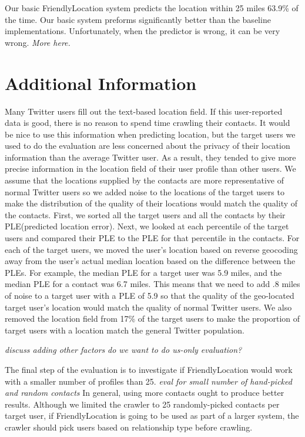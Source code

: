 Our basic FriendlyLocation system predicts the location within 25 miles 63.9\% of
the time.
%
Our basic system preforms significantly better than the baseline implementations.
%
Unfortunately, when the predictor is wrong, it can be very wrong. \emph{More here.}
%
%


\section{Additional Information}
Many Twitter users fill out the text-based location field.
%
If this user-reported data is good, there is no reason to spend time
crawling their contacts.
%
It would be nice to use this information when predicting location, but
the target users we used to do the evaluation are less concerned about
the privacy of their location information than the average Twitter user.
%
As a result, they tended to give more precise information in the location
field of their user profile than other users.
%
We assume that the locations supplied by the contacts are more
representative of normal Twitter users so we added noise to the locations
of the target users to make the distribution of the quality of their
locations would match the quality of the contacts.
%
First, we sorted all the target users and all the contacts by their
PLE(predicted location error).
%
Next, we looked at each percentile of the target users and compared
their PLE to the PLE for that percentile in the contacts.
%
For each of the target users, we moved the user's location based on
reverse geocoding away from the user's actual median location based on the
difference between the PLEs.
%
For example, the median PLE for a target user was 5.9 miles, and the median
PLE for a contact was 6.7 miles.
%
This means that we need to add .8 miles of noise to a target user
with a PLE of 5.9 so that the quality of the geo-located target user's location
would match the quality of normal Twitter users.
%
We also removed the location field from 17\% of the target users to
make the proportion of target users with a location match the general
Twitter population.

\emph{discuss adding other factors}
\emph{do we want to do us-only evaluation?}

The final step of the evaluation is to investigate if FriendlyLocation would
work with a smaller number of profiles than 25.
%
\emph{eval for small number of hand-picked and random contacts}
%
In general, using more contacts ought to produce better results.
%
Although we limited the crawler to 25 randomly-picked contacts per target
user, if FriendlyLocation is going to be used as part of a larger system, the
crawler should pick users based on relationship type before crawling.

